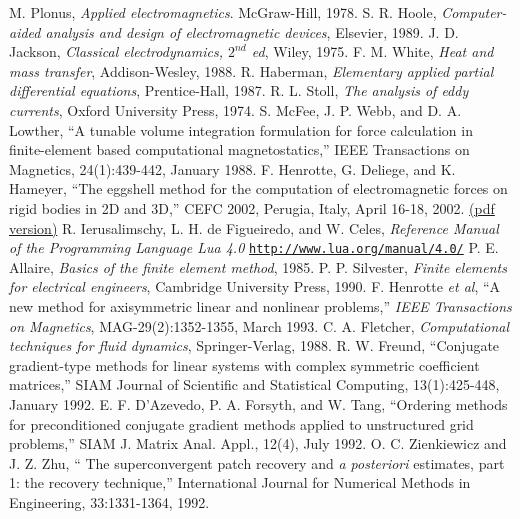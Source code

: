 \documentclass[12pt]{report}
\begin{document}
\newpage
\begin{thebibliography}{99}
 M. Plonus, {\em Applied electromagnetics}. McGraw-Hill, 1978.
 S. R. Hoole, {\em Computer-aided analysis and design of
electromagnetic devices}, Elsevier, 1989.
 J. D. Jackson, {\em Classical electrodynamics, $2^{nd}$ ed},
Wiley, 1975.
 F. M. White, {\em Heat and mass transfer}, Addison-Wesley, 1988.
 R. Haberman, {\em Elementary applied partial differential equations}, Prentice-Hall, 1987.
 R. L. Stoll, {\em The analysis of eddy currents},
Oxford University Press, 1974.
 S. McFee, J. P. Webb, and D. A. Lowther, ``A
tunable volume integration formulation for force calculation in
finite-element based computational magnetostatics,'' IEEE
Transactions on Magnetics, 24(1):439-442, January 1988.
 F. Henrotte, G. Deliege, and K. Hameyer, ``The
eggshell method for the computation of electromagnetic forces on
rigid bodies in 2D and 3D,'' CEFC 2002, Perugia, Italy, April
16-18, 2002.
\href{http://www.esat.kuleuven.ac.be/electa/publications/fulltexts/pub_942.pdf}{(pdf version)}
 R. Ierusalimschy, L. H. de Figueiredo, and W. Celes,
{\em Reference Manual of the Programming Language Lua 4.0}
\href{http://www.lua.org/manual/4.0/}{\tt http://www.lua.org/manual/4.0/}
 P. E. Allaire, {\em Basics of the finite element
method}, 1985.
 P. P. Silvester, {\em Finite elements for electrical engineers},
Cambridge University Press, 1990.
 F. Henrotte {\em et al}, ``A new method for
axisymmetric linear and nonlinear problems,'' {\em IEEE
Transactions on Magnetics}, MAG-29(2):1352-1355, March 1993.
 C. A. Fletcher, {\em Computational techniques
for fluid dynamics}, Springer-Verlag, 1988.
 R. W. Freund, ``Conjugate gradient-type methods
for linear systems with complex symmetric coefficient matrices,''
SIAM Journal of Scientific and Statistical Computing,
13(1):425-448, January 1992.
 E. F. D'Azevedo, P. A. Forsyth, and W. Tang,
``Ordering methods for preconditioned conjugate gradient methods
applied to unstructured grid problems,'' SIAM J. Matrix Anal.
Appl., 12(4), July 1992.
 O. C. Zienkiewicz and J. Z. Zhu, `` The
superconvergent patch recovery and {\em a posteriori} estimates,
part 1:  the recovery technique,'' International Journal for
Numerical Methods in Engineering, 33:1331-1364, 1992.

\end{thebibliography}
\end{document}
